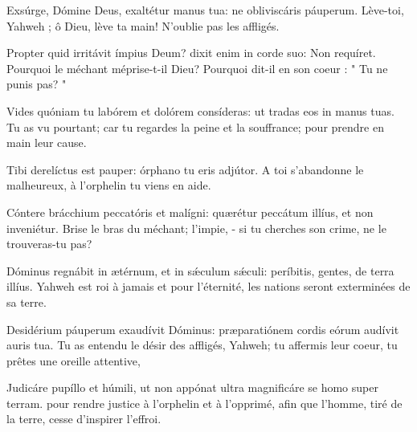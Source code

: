 \Gloria
\begin{paracol}{2}

\LigneParacol{0cm}
{Exsúrge, Dómine Deus, exaltétur manus tua: \GreStar{} ne obliviscáris páuperum.}
{Lève-toi, Yahweh ; ô Dieu, lève ta main! N'oublie pas les affligés. }

\LigneParacol{0.2cm}
{Propter quid irritávit ímpius Deum? \GreStar{} dixit enim in corde suo: Non requíret.}
{Pourquoi le méchant méprise-t-il Dieu? Pourquoi dit-il en son coeur : " Tu ne punis pas? " }

\LigneParacol{0.2cm}
{Vides quóniam tu labórem et dolórem consíderas: \GreStar{} ut tradas eos in manus tuas.}
{Tu as vu pourtant; car tu regardes la peine et la souffrance; pour prendre en main leur cause.}

\LigneParacol{0.2cm}
{Tibi derelíctus est pauper: \GreStar{} órphano tu eris adjútor.}
{A toi s'abandonne le malheureux, à l'orphelin tu viens en aide. }

\LigneParacol{0.2cm}
{Cóntere brácchium peccatóris et malígni: \GreStar{} quærétur peccátum illíus, et non inveniétur.}
{Brise le bras du méchant; l'impie, - si tu cherches son crime, ne le trouveras-tu pas?}

\LigneParacol{0.2cm}
{Dóminus regnábit in ætérnum, et in sǽculum sǽculi: \GreStar{} períbitis, gentes, de terra illíus.}
{Yahweh est roi à jamais et pour l'éternité, les nations seront exterminées de sa terre. }

\LigneParacol{0.2cm}
{Desidérium páuperum exaudívit Dóminus: \GreStar{} præparatiónem cordis eórum audívit auris tua.}
{Tu as entendu le désir des affligés, Yahweh; tu affermis leur coeur, tu prêtes une oreille attentive, }

\LigneParacol{0.2cm}
{Judicáre pupíllo et húmili, \GreStar{} ut non appónat ultra magnificáre se homo super terram.}
{pour rendre justice à l'orphelin et à l'opprimé, afin que l'homme, tiré de la terre, cesse d'inspirer l'effroi. }

\end{paracol}
